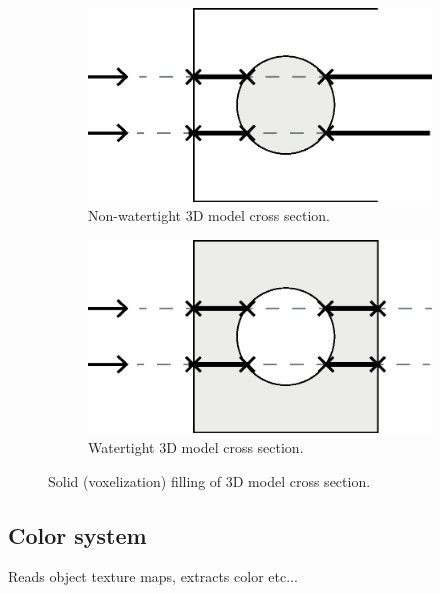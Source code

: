 \begin{figure}[h]
    \centering
    \begin{subfigure}[b]{0.45\textwidth}
        \centering
        \includegraphics[width=\textwidth]{sections/methodology/figures/solid-non-watertight}
        \caption{Non-watertight 3D model cross section.}
        \label{fig:filling-non-watertight-model}
    \end{subfigure}
    \hfill
    \begin{subfigure}[b]{0.45\textwidth}
        \centering
        \includegraphics[width=\textwidth]{sections/methodology/figures/solid-watertight}
        \caption{Watertight 3D model cross section.}
        \label{fig:filling-watertight-model}
    \end{subfigure}
       \caption{Solid (voxelization) filling of 3D model cross section.}
       \label{fig:filling-3d-model}
\end{figure}


\subsection{Color system}
Reads object texture maps, extracts color etc...

